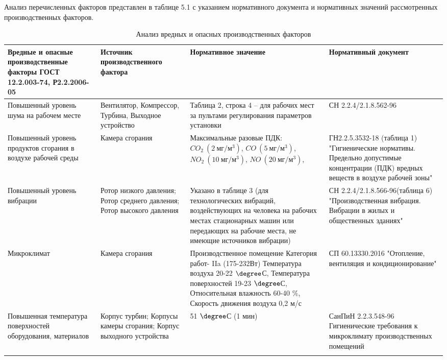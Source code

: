 Анализ перечисленных факторов представлен в таблице 5.1 с указанием нормативного документа и нормативных значений рассмотренных производственных факторов.

\begin{longtable}{|p{4cm}|p{3cm}|p{5cm}|p{4cm}|}
	\hline
	\textbf{Вредные и опасные производственные факторы ГОСТ 12.2.003-74, Р2.2.2006-05} &
	\textbf{Источник производственного фактора} &
	\textbf{Нормативное значение} &
	\textbf{Нормативный документ} \\ \hline
	\endhead

	Повышенный уровень шума на рабочем месте &
	Вентилятор, Компрессор, Турбина, Выходное устройство &
	Таблица 2, строка 4 – для рабочих мест за пультами регулирования параметров установки &
	СН 2.2.4/2.1.8.562-96 \\ \hline

	Повышенный уровень продуктов сгорания в воздухе рабочей среды &
	Камера сгорания &
	Максимальные разовые ПДК: $CO_2 \ (2 \ мг/м^3)$, $CO \ (5 \ мг/м^3)$, $NO_2 \ (10 \ мг/м^3)$, $NO \ (20 \ мг/м^3)$,  &
	ГН2.2.5.3532-18 (таблица 1) "Гигиенические нормативы. Предельно допустимые концентрации (ПДК) вредных веществ в воздухе рабочей зоны" \\ \hline

	Повышенный уровень вибрации &
	Ротор низкого давления; Ротор среднего давления; Ротор высокого давления &
	Указано в таблице 3 (для технологических вибраций, воздействующих на человека на рабочих местах стационарных машин или передающих на рабочие места, не имеющие источников вибрации) &
	СН 2.2.4/2.1.8.566-96(таблица 6) "Производственная вибрация. Вибрации в жилых и общественных зданиях" \\ \hline

	Микроклимат &
	Камера сгорания &
	Производственное помещение Категория работ- IIa (175-232Вт) Температура воздуха 20-22 $\degree$С, Температура поверхностей 19-23 $\degree$С, Относительная влажность 60-40 \%, Скорость движения воздуха 0,2 м/с &
	СП 60.13330.2016 "Отопление, вентиляция и кондиционирование" \\ \hline

	Повышенная температура поверхностей оборудования, материалов &
	Корпус турбин; Корпусы камеры сгорания; Корпус выходного устройства &
	51 $\degree$С (1 мин) &
	СанПиН 2.2.3.548-96 Гигиенические требования к микроклимату производственных помещений \\ \hline

	\caption{Анализ вредных и опасных производственных факторов} \label{tab:ecology-factor-analisys}
\end{longtable}

